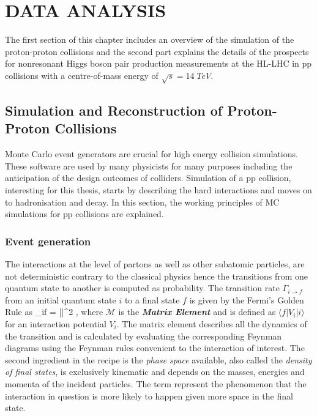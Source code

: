\chapter{DATA ANALYSIS}\label{ch3}

The first section of this chapter includes an overview of the simulation of the proton-proton collisions and the second part explains the details of the prospects for nonresonant Higgs boson pair production measurements at the HL-LHC in pp collisions with a centre-of-mass energy of $\sqrt{s}=14\;TeV$.

\section{Simulation and Reconstruction of Proton-Proton Collisions}
Monte Carlo event generators are crucial for high energy collision simulations. These software are used by many physicists for many purposes including the anticipation of the design outcomes of colliders. Simulation of a pp collision, interesting for this thesis, starts by describing the hard interactions and moves on to hadronisation and decay. In this section, the working principles of MC simulations for pp collisions are explained.

\subsection{Event generation}

The interactions at the level of partons as well as other subatomic particles, are not deterministic contrary to the classical physics hence the transitions from one quantum state to another is computed as probability. The transition rate $\Gamma_{i\rightarrow f}$ from an initial quantum state $i$ to a final state $f$ is given by the Fermi's Golden Rule as
\be
\Gamma_{i\rightarrow f} = \frac{2\pi}{\hbar}||^2 \rho \; ,
\ee
where $\mathcal{M}$ is the \emph{\bf{Matrix Element}} and is defined as $\langle f|V_i|i\rangle$ for an interaction potential $V_i$. The matrix element describes all the dynamics of the transition and is calculated by evaluating the corresponding Feynman diagrams using the Feynman rules convenient to the interaction of interest. The second ingredient in the recipe is the \emph{phase space} available, also called the \emph{density of final states}, is exclusively kinematic and depends on the masses, energies and momenta of the incident particles. The term represent the phenomenon that the interaction in question is more likely to happen given more space in the final state.

